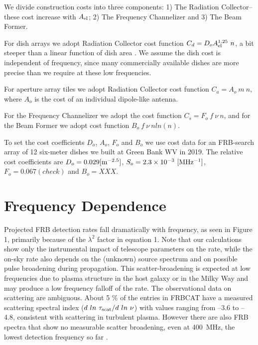 \documentclass[fleqn,usenatbib]{mnras}
\begin{document}
We divide construction costs into three components: 1) The Radiation Collector--these cost increase with $A_{\rm{el}}$; 2) The Frequency Channelizer and 3) The Beam Former. 

For dish arrays we adopt Radiation Collector cost function $C_d = D_o A_{\rm{el}}^{1.25} ~n $, a bit steeper than a linear function of dish area \citep{10.1117/12.552181}.
We assume the dish cost is independent of frequency, since many commercially available dishes are more precise than we require at these low frequencies.


For aperture array tiles we adopt Radiation Collector cost function $C_a = A_o ~m ~n$, where $A_o$ is the cost of an individual dipole-like antenna.

For the Frequency Channelizer we adopt the cost function $C_s = F_o ~f ~\nu ~n$, and for the Beam Former we adopt cost function $B_o ~f ~\nu ~n ln(n)$.

To set the cost coefficients $D_o$, $A_o$, $F_o$ and $B_o$ we use cost data for an FRB-search array of 12 six-meter dishes we built at Green Bank WV in 2019.   The relative cost coefficients are
$D_o= 0.029 [\rm{m^{-2.5}}]$, $ S_o = 2.3 \times 10^{-3}\rm{~[MHz^{-1}}]$, $F_o = 0.067 (check)$ and $B_o = XXX$. 





\section{Frequency Dependence}

Projected FRB detection rates fall dramatically with frequency, as seen in Figure 1, primarily because of the $\lambda^2$ factor in equation 1.
Note that our calculations show only the instrumental impact of telescope parameters on the rate, while the on-sky rate also depends on the (unknown) source spectrum and on possible pulse broadening during propagation. This scatter-broadening is expected at low frequencies due to plasma structure in the host galaxy or in the Milky Way and may produce a low frequency falloff of the rate. The observational data on scattering are ambiguous. About 5 \% of the entries in FRBCAT \citep{frbcat}  have a measured scattering spectral index ($d ~ln ~\tau_{\rm{scat}}/ d ~ln ~\nu$) with values ranging from --3.6 to --4.8, consistent with scattering in turbulent plasma. However there are also FRB spectra that show no measurable scatter broadening, even at 400~MHz, the lowest detection frequency so far \citep{chime1}. 
\end{document}
